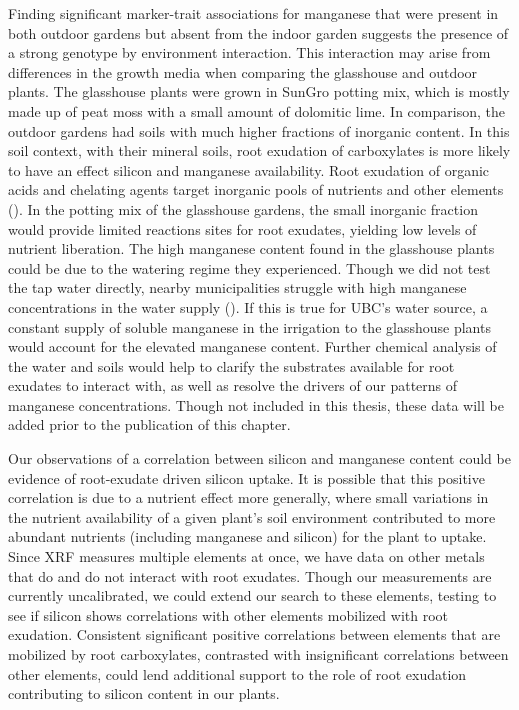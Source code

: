 \documentclass[12pt, letterpaper]{report}
\begin{document}
Finding significant marker-trait associations for manganese that were present in both outdoor gardens but absent from the indoor garden suggests the presence of a strong genotype by environment interaction. This interaction may arise from differences in the growth media when comparing the glasshouse and outdoor plants. The glasshouse plants were grown in SunGro potting mix, which is mostly made up of peat moss with a small amount of dolomitic lime. In comparison, the outdoor gardens had soils with much higher fractions of inorganic content. In this soil context, with their mineral soils, root exudation of carboxylates is more likely to have an effect silicon and manganese availability. Root exudation of organic acids and chelating agents target inorganic pools of nutrients and other elements (\cite{lambers_plant_2008,de_tombeur_silicon_2021-1}). In the potting mix of the glasshouse gardens, the small inorganic fraction would provide limited reactions sites for root exudates, yielding low levels of nutrient liberation. The high manganese content found in the glasshouse plants could be due to the watering regime they experienced. Though we did not test the tap water directly, nearby municipalities struggle with high manganese concentrations in the water supply (\cite{hu_drinking_2020}). If this is true for UBC’s water source, a constant supply of soluble manganese in the irrigation to the glasshouse plants would account for the elevated manganese content. Further chemical analysis of the water and soils would help to clarify the substrates available for root exudates to interact with, as well as resolve the drivers of our patterns of manganese concentrations. Though not included in this thesis, these data will be added prior to the publication of this chapter. 

Our observations of a correlation between silicon and manganese content could be evidence of root-exudate driven silicon uptake. It is possible that this positive correlation is due to a nutrient effect more generally, where small variations in the nutrient availability of a given plant’s soil environment contributed to more abundant nutrients (including manganese and silicon) for the plant to uptake. Since XRF measures multiple elements at once, we have data on other metals that do and do not interact with root exudates. Though our measurements are currently uncalibrated, we could extend our search to these elements, testing to see if silicon shows correlations with other elements mobilized with root exudation. Consistent significant positive correlations between elements that are mobilized by root carboxylates, contrasted with insignificant correlations between other elements, could lend additional support to the role of root exudation contributing to silicon content in our plants. 
\end{document}
